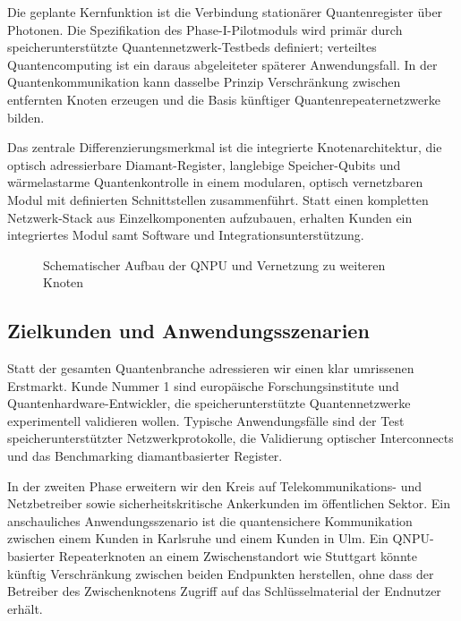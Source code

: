\documentclass[11pt,oneside]{scrartcl}
\begin{document}
Die geplante Kernfunktion ist die Verbindung station\"arer Quantenregister \"uber Photonen. Die Spezifikation des Phase-I-Pilotmoduls wird prim\"ar durch speicherunterst\"utzte Quantennetzwerk-Testbeds definiert; verteiltes Quantencomputing ist ein daraus abgeleiteter sp\"aterer Anwendungsfall. In der Quantenkommunikation kann dasselbe Prinzip Verschr\"ankung zwischen entfernten Knoten erzeugen und die Basis k\"unftiger Quantenrepeaternetzwerke bilden.

Das zentrale Differenzierungsmerkmal ist die integrierte Knotenarchitektur, die optisch adressierbare Diamant-Register, langlebige Speicher-Qubits und w\"armelastarme Quantenkontrolle in einem modularen, optisch vernetzbaren Modul mit definierten Schnittstellen zusammenf\"uhrt. Statt einen kompletten Netzwerk-Stack aus Einzelkomponenten aufzubauen, erhalten Kunden ein integriertes Modul samt Software und Integrationsunterst\"utzung.

\begin{figure}[ht]
  \centering
  \caption{Schematischer Aufbau der QNPU und Vernetzung zu weiteren Knoten}
\end{figure}

\subsection{Zielkunden und Anwendungsszenarien}
Statt der gesamten Quantenbranche adressieren wir einen klar umrissenen Erstmarkt. Kunde Nummer 1 sind europ\"aische Forschungsinstitute und Quantenhardware-Entwickler, die speicherunterst\"utzte Quantennetzwerke experimentell validieren wollen. Typische Anwendungsf\"alle sind der Test speicherunterst\"utzter Netzwerkprotokolle, die Validierung optischer Interconnects und das Benchmarking diamantbasierter Register.

In der zweiten Phase erweitern wir den Kreis auf Telekommunikations- und Netzbetreiber sowie sicherheitskritische Ankerkunden im \"offentlichen Sektor. Ein anschauliches Anwendungsszenario ist die quantensichere Kommunikation zwischen einem Kunden in Karlsruhe und einem Kunden in Ulm. Ein QNPU-basierter Repeaterknoten an einem Zwischenstandort wie Stuttgart k\"onnte k\"unftig Verschr\"ankung zwischen beiden Endpunkten herstellen, ohne dass der Betreiber des Zwischenknotens Zugriff auf das Schl\"usselmaterial der Endnutzer erh\"alt.
\end{document}
